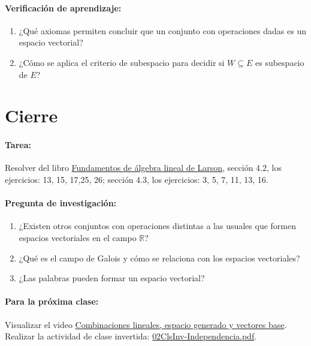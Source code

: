 \documentclass[a4,11pt]{aleph-notas}
\begin{document}
\paragraph{Verificación de aprendizaje:}
\begin{enumerate}[leftmargin=*]
    \item ¿Qué axiomas permiten concluir que un conjunto con operaciones dadas es un espacio vectorial?
    \item ¿Cómo se aplica el criterio de subespacio para decidir si $W\subseteq E$ es subespacio de $E$?
\end{enumerate}

\section*{Cierre}

\paragraph{Tarea:}
Resolver del libro \href{https://catalogobiblioteca.puce.edu.ec/cgi-bin/koha/opac-detail.pl?biblionumber=86081}{Fundamentos de álgebra lineal de Larson}, sección 4.2, los ejercicios: 13, 15, 17,25, 26; sección 4.3, los ejercicios: 3, 5, 7, 11, 13, 16.

\paragraph{Pregunta de investigación:}
\begin{enumerate}[leftmargin=*]
    \item ¿Existen otros conjuntos con operaciones distintas a las usuales que formen espacios vectoriales en el campo $\mathbb{R}$?
    \item ¿Qué es el campo de Galois y cómo se relaciona con los espacios vectoriales?
    \item ¿Las palabras pueden formar un espacio vectorial? 
\end{enumerate}

\paragraph{Para la próxima clase:}  
Visualizar el video \href{https://www.youtube.com/watch?v=k7RM-ot2NWY\&list=PLZHQObOWTQDPD3MizzM2xVFitgF8hE\_ab\&index=2}{Combinaciones lineales, espacio generado y vectores base}.
Realizar la actividad de clase invertida: \href{https://fcena-puce.github.io/AlgebraLineal-05-N0048/07Act-ClaseInvertida/02ClsInv-Independencia.pdf}{02ClsInv-Independencia.pdf}.
\end{document}
